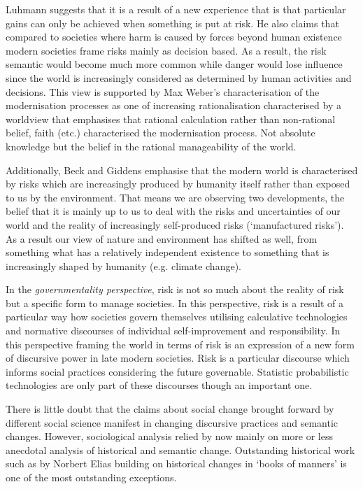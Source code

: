 Luhmann suggests that it is a result of a new experience that is that particular gains can only be achieved when something is put at risk. He also claims that compared to societies where harm is caused by forces beyond human existence modern societies frame risks mainly as decision based. As a result, the risk semantic would become much more common while danger would lose influence since the world is increasingly considered as determined by human activities and decisions. This view is supported by Max Weber's characterisation of the modernisation processes as one of increasing rationalisation characterised by a worldview that emphasises that rational calculation rather than non-rational belief, faith (etc.) characterised the modernisation process. Not absolute knowledge but the belief in the rational manageability of the world.

Additionally, Beck and Giddens emphasise that the modern world is characterised by risks which are increasingly produced by humanity itself rather than exposed to us by the environment. That means we are observing two developments, the belief that it is mainly up to us to deal with the risks and uncertainties of our world and the reality of increasingly self-produced risks (`manufactured risks'). As a result our view of nature and environment has shifted as well, from something what has a relatively independent existence to something that is increasingly shaped by humanity (e.g. climate change).

In the \emph{governmentality perspective}, risk is not so much about the reality of risk but a specific form to manage societies. In this perspective, risk is a result of a particular way how societies govern themselves utilising calculative technologies and normative discourses of individual self-improvement and responsibility. In this perspective framing the world in terms of risk is an expression of a new form of discursive power in late modern societies. Risk is a particular discourse which informs social practices considering the future governable. Statistic probabilistic technologies are only part of these discourses though an important one.

There is little doubt that the claims about social change brought forward by different social science manifest in changing discursive practices and semantic changes. However, sociological analysis relied by now mainly on more or less anecdotal analysis of historical and semantic change. Outstanding historical work such as by Norbert Elias building on historical changes in `books of manners' is one of the most outstanding exceptions. 

